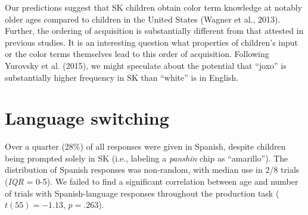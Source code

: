 \documentclass[
  english,
  ,man,floatsintext]{apa6}
\begin{document}
Our predictions suggest that SK children obtain color term knowledge at notably older ages compared to children in the United States (Wagner et al., 2013). Further, the ordering of acquisition is substantially different from that attested in previous studies. It is an interesting question what properties of children's input or the color terms themselves lead to this order of acquisition. Following Yurovsky et al. (2015), we might speculate about the potential that \enquote{joxo} is substantially higher frequency in SK than \enquote{white} is in English.

\hypertarget{language-switching}{%
\section{Language switching}\label{language-switching}}

Over a quarter (28\%) of all responses were given in Spanish, despite children being prompted solely in SK (i.e., labeling a \emph{panshin} chip as \enquote{amarillo}). The distribution of Spanish responses was non-random, with median use in 2/8 trials (\emph{IQR} = 0-5). We failed to find a significant correlation between age and number of trials with Spanish-language responses throughout the production task (\(t(55) = -1.13\), \(p = .263\)).
\end{document}
